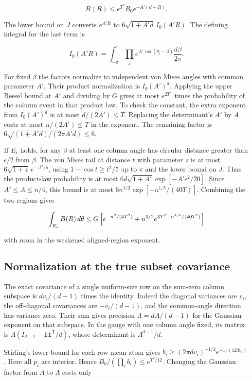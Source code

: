 \documentclass[11pt]{article}
\begin{document}
\[
B(R)\le e^{T^2}B_0 e^{-A'(d-R)}.
\]

The lower bound on $J$ converts $e^{A'R}$ to
$6\sqrt{1+A'd}\,I_0(A'R)$. The defining integral for the last term is

\[
I_0(A'R)=\int_{-\pi}^{\pi}\prod_j e^{A'\cos(\theta_j-\beta)}
\frac{d\beta}{2\pi}.
\]

For fixed $\beta$ the factors normalize to independent von Mises
angles with common parameter $A'$. Their product normalization is
$I_0(A')^d$. Applying the upper Bessel bound at $A'$ and dividing by
$G$ gives at most $e^{2T^2}$ times the probability of the column event
in that product law. To check the constant, the extra exponent from
$I_0(A')^d$ is at most $d/(2A')\le T$. Replacing the determinant's $A'$
by $A$ costs at most $n/(2A')\le T$ in the exponent. The remaining
factor is $6\sqrt{(1+A'd)/(2\pi A'd)}\le6$.

If $E_\epsilon$ holds, for any $\beta$ at least one column angle
has circular distance greater than $\epsilon/2$ from $\beta$.
The von Mises tail at distance $t$ with parameter $z$ is at most
$6\sqrt{1+z}\,e^{-zt^2/5}$, using $1-\cos t\ge t^2/5$ up to $\pi$
and the lower bound on $J$. Thus the product-law probability
is at most $6d\sqrt{1+A'}\exp[-A'\epsilon^2/20]$.
Since $A'\le A\le n/4$, this bound is at most
$6n^{3/2}\exp[-n^{1/5}/(40T)]$. Combining the two regions gives

\[
\int_{E_\epsilon} B(R)\thinspace{}d\theta
\le G\left[e^{-n^2/(4T^2)}
+n^{3/2}e^{3T^2-n^{1/5}/(40T^2)}\right]
\]

with room in the weakened aligned-region exponent.

\subsection{Normalization at the true subset covariance}

The exact covariance of a single uniform-size row on the
sum-zero column subspace is $d v_i/(d-1)$ times the identity.
Indeed the diagonal variances are $v_i$, the off-diagonal
covariances are $-v_i/(d-1)$, and the common-angle direction
has variance zero. Their sum gives precision $\Lambda=dA/(d-1)$
for the Gaussian exponent on that subspace.
In the gauge with one column angle fixed, its matrix is
$\Lambda(I_{d-1}-\mathbf1\mathbf1^{\mathsf T}/d)$, whose determinant
is $\Lambda^{d-1}/d$.

Stirling's lower bound for each row mean atom gives
$b_i\ge(2\pi d v_i)^{-1/2}e^{-1/(12d v_i)}$.
Here all $p_i$ are interior. Hence $B_0/(\prod_i b_i)\le e^{T^2/12}$.
Changing the Gaussian factor from $A$ to $\Lambda$ costs only
\end{document}
